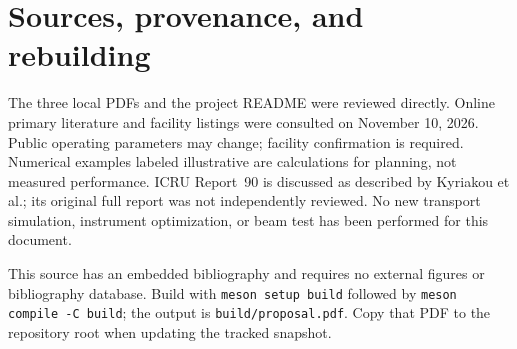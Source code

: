 \documentclass[11pt,letterpaper]{article}
\begin{document}
\appendix
\section{Sources, provenance, and rebuilding}

The three local PDFs and the project README were reviewed directly. Online primary literature and
facility listings were consulted on November 10, 2026. Public operating parameters may change;
facility confirmation is required. Numerical examples labeled illustrative are calculations for
planning, not measured performance. ICRU Report~90 is discussed as described by Kyriakou et al.;
its original full report was not independently reviewed. No new transport simulation, instrument
optimization, or beam test has been performed for this document.

This source has an embedded bibliography and requires no external figures or bibliography database.
Build with \texttt{meson setup build} followed by \texttt{meson compile -C build}; the output is
\texttt{build/proposal.pdf}. Copy that PDF to the repository root when updating the tracked snapshot.
\end{document}
